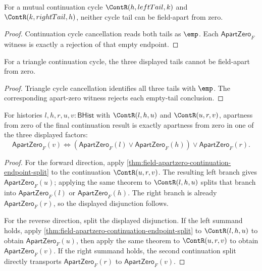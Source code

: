 \begin{theorem}
\label{thm:field-apartzero-mutual-continuation-cycle-tails-absurd}
For a mutual continuation cycle $\ContR(h,leftTail,k)$ and
$\ContR(k,rightTail,h)$, neither cycle tail can be field-apart from zero.
\end{theorem}
\begin{proof}
Continuation cycle cancellation reads both tails as $\emp$. Each
$\mathsf{ApartZero}_F$ witness is exactly a rejection of that empty endpoint.
\end{proof}

\begin{theorem}
\label{thm:field-apartzero-triangle-continuation-cycle-tails-absurd}
For a triangle continuation cycle, the three displayed tails cannot be
field-apart from zero.
\end{theorem}
\begin{proof}
Triangle cycle cancellation identifies all three tails with $\emp$. The
corresponding apart-zero witness rejects each empty-tail conclusion.
\end{proof}

\begin{theorem}
\label{thm:field-apartzero-two-step-continuation-split}
For histories $l,h,r,u,v:\mathsf{BHist}$ with $\ContR(l,h,u)$ and
$\ContR(u,r,v)$, apartness from zero of the final continuation result is
exactly apartness from zero in one of the three displayed factors:
$$
\mathsf{ApartZero}_F(v)
\Longleftrightarrow
(\mathsf{ApartZero}_F(l)\lor\mathsf{ApartZero}_F(h))
\lor\mathsf{ApartZero}_F(r).
$$
\end{theorem}
\begin{proof}
For the forward direction, apply
\autoref{thm:field-apartzero-continuation-endpoint-split} to the continuation
$\ContR(u,r,v)$. The resulting left branch gives $\mathsf{ApartZero}_F(u)$;
applying the same theorem to $\ContR(l,h,u)$ splits that branch into
$\mathsf{ApartZero}_F(l)$ or $\mathsf{ApartZero}_F(h)$. The right branch is
already $\mathsf{ApartZero}_F(r)$, so the displayed disjunction follows.

For the reverse direction, split the displayed disjunction. If the left
summand holds, apply
\autoref{thm:field-apartzero-continuation-endpoint-split} to $\ContR(l,h,u)$
to obtain $\mathsf{ApartZero}_F(u)$, then apply the same theorem to
$\ContR(u,r,v)$ to obtain $\mathsf{ApartZero}_F(v)$. If the right summand
holds, the second continuation split directly transports
$\mathsf{ApartZero}_F(r)$ to $\mathsf{ApartZero}_F(v)$.
\end{proof}

